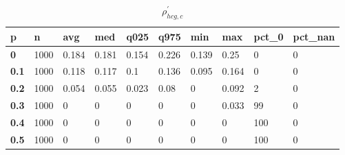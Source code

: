 \begin{table}[h]
 \centering 
\footnotesize
\caption{$\rho_{hcg,c}^\prime $}
\label{tab:alphahcgc}
\begin{tabular}[h]{|l|l|l|l|l|l|l|l|l|l|
    } \hline
\textbf{ p} & \textbf{ n} & \textbf{ avg} & \textbf{ med} & \textbf{ q025} & \textbf{ q975} & \textbf{ min} & \textbf{ max} & \textbf{ pct\_0} & \textbf{ pct\_nan}
    \\ \hline
  \textbf{  0} & 1000 & 0.184 & 0.181 & 0.154 & 0.226 & 0.139 &  0.25 &   0 & 0
    \\ \hline
  \textbf{0.1} & 1000 & 0.118 & 0.117 &   0.1 & 0.136 & 0.095 & 0.164 &   0 & 0
    \\ \hline
  \textbf{0.2} & 1000 & 0.054 & 0.055 & 0.023 &  0.08 &     0 & 0.092 &   2 & 0
    \\ \hline
  \textbf{0.3} & 1000 &     0 &     0 &     0 &     0 &     0 & 0.033 &  99 & 0
    \\ \hline
  \textbf{0.4} & 1000 &     0 &     0 &     0 &     0 &     0 &     0 & 100 & 0
    \\ \hline
  \textbf{0.5} & 1000 &     0 &     0 &     0 &     0 &     0 &     0 & 100 & 0
    \\ \hline
 \end{tabular}
 \end{table}
